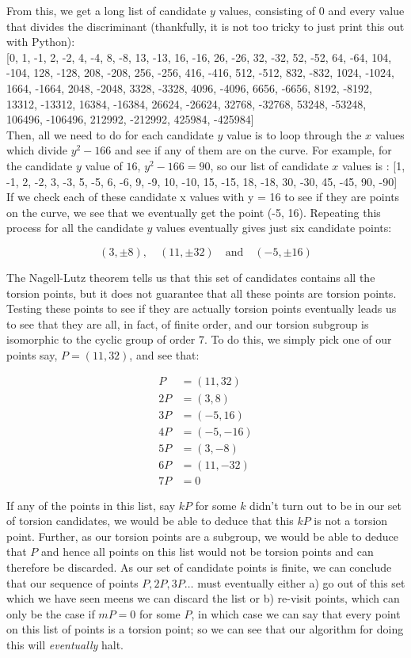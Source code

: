 \documentclass{article}
\begin{document}
From this, we get a long list of candidate $y$ values, consisting of 0 and every value that divides the discriminant (thankfully, it is not too tricky to just print this out with Python):\\

[0, 1, -1, 2, -2, 4, -4, 8, -8, 13, -13, 16, -16, 26, -26, 32, -32, 52, -52, 64, -64, 104, -104, 128, -128, 208, -208, 256, -256, 416, -416, 512, -512, 832, -832, 1024, -1024, 1664, -1664, 2048, -2048, 3328, -3328, 4096, -4096, 6656, -6656, 8192, -8192, 13312, -13312, 16384, -16384, 26624, -26624, 32768, -32768, 53248, -53248, 106496, -106496, 212992, -212992, 425984, -425984]\\

Then, all we need to do for each candidate $y$ value is to loop through the $x$ values which divide $y^2 - 166$ and see if any of them are on the curve. For example, for the candidate $y$ value of $16$, $y^2 - 166 = 90$, so our list of candidate $x$ values is : [1, -1, 2, -2, 3, -3, 5, -5, 6, -6, 9, -9, 10, -10, 15, -15, 18, -18, 30, -30, 45, -45, 90, -90] If we check each of these candidate x values with y = 16 to see if they are points on the curve, we see that we eventually get the point (-5, 16). Repeating this process for all the candidate $y$ values eventually  gives just six candidate points:

\[(3, \pm 8), \quad (11, \pm 32) \quad \text{and} \quad (-5, \pm 16)\]

The Nagell-Lutz theorem tells us that this set of candidates contains all the torsion points, but it does not guarantee that all these points are torsion points. Testing these points to see if they are actually torsion points eventually leads us to see that they are all, in fact, of finite order, and our torsion subgroup is isomorphic to the cyclic group of order $7$. To do this, we simply pick one of our points say, $P = (11, 32)$, and see that:

\begin{align*} 
P &= (11, 32)\\
2P &= (3, 8)\\
3P &= (-5, 16)\\
4P &= (-5, -16)\\
5P &= (3, -8)\\
6P &= (11, -32)\\
7P &= 0
\end{align*} 

If any of the points in this list, say $kP$ for some $k$ didn't turn out to be in our set of torsion candidates, we would be able to deduce that this $kP$ is not a torsion point. Further, as our torsion points are a subgroup, we would be able to deduce that $P$ and hence all points on this list would not be torsion points and can therefore be discarded. As our set of candidate points is finite, we can conclude that our sequence of points $P, 2P, 3P \dots$ must eventually either a) go out of this set which we have seen meens we can discard the list or b) re-visit points, which can only be the case if $mP = 0$ for some $P$, in which case we can say that every point on this list of points is a torsion point; so we can see that our algorithm for doing this will \emph{eventually} halt.\\
\end{document}

